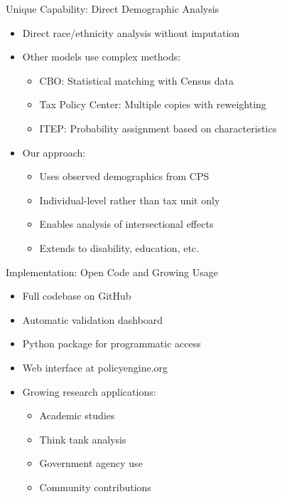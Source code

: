 \documentclass{beamer}
\begin{document}
\begin{frame}{Unique Capability: Direct Demographic Analysis}
    \begin{itemize}
        \item Direct race/ethnicity analysis without imputation
        \item Other models use complex methods:
        \begin{itemize}
            \item CBO: Statistical matching with Census data
            \item Tax Policy Center: Multiple copies with reweighting
            \item ITEP: Probability assignment based on characteristics
        \end{itemize}
        \item Our approach:
        \begin{itemize}
            \item Uses observed demographics from CPS
            \item Individual-level rather than tax unit only
            \item Enables analysis of intersectional effects
            \item Extends to disability, education, etc.
        \end{itemize}
    \end{itemize}
\end{frame}

\begin{frame}{Implementation: Open Code and Growing Usage}
    \begin{itemize}
        \item Full codebase on GitHub
        \item Automatic validation dashboard
        \item Python package for programmatic access
        \item Web interface at policyengine.org
        \item Growing research applications:
        \begin{itemize}
            \item Academic studies
            \item Think tank analysis
            \item Government agency use
            \item Community contributions
        \end{itemize}
    \end{itemize}
\end{frame}
\end{document}
